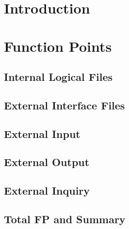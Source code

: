 \documentclass[12pt, a4paper]{article}
\title{
	\Huge{\textbf{\centerline{myTaxiService}}}
	\newline
	\huge{\textbf{P}roject \textbf{P}lan}
}
\author{
	Monica Magoni 854091
	\\
	Alberto Cibari 852689
}
\date{\today}
\begin{document}
	\maketitle
	\newpage
	\renewcommand*\contentsname{\Huge{Contents}}
	\tableofcontents
	
	\newpage
	
	\section{Introduction}
	    
	
    \section{Function Points}
    	
    	
    	\subsection{Internal Logical Files}
    	
    	
    	\subsection{External Interface Files}
    	
    	
    	\subsection{External Input}
    	
    	
    	\subsection{External Output}
    	
    	
    	\subsection{External Inquiry}
    	
    	
    	\subsection{Total FP and Summary}
    	
    
\end{document}
